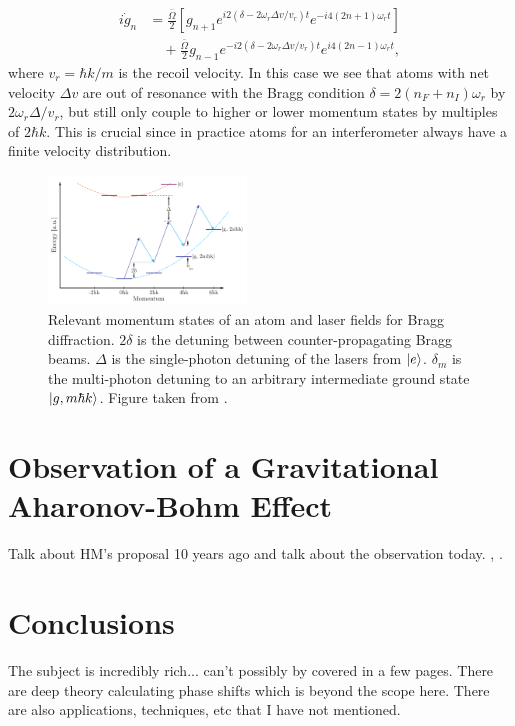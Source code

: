 \documentclass[reprint,
nofootinbib,
amsmath,amssymb,
aps]{revtex4-1}
\newcommand{\f}[2]{\frac{#1}{#2}}
\newcommand{\lb}{\left[}
\newcommand{\rb}{\right]}
\begin{document}
\begin{align*}
i\dot{g}_n &= \f{\bar{\Omega}}{2}\lb g_{n+1} e^{i2(\delta - 2\omega_r \Delta v/v_r)t} e^{-i4(2n+1)\omega_r t} \rb \\ 
& \quad + \f{\bar{\Omega}}{2}g_{n-1} e^{-i2(\delta - 2\omega_r \Delta v/v_r) t} e^{i4(2n-1)\omega_r t} ,
\end{align*}
where $v_r = \hbar k/m$ is the recoil velocity. In this case we see that atoms with net velocity $\Delta v$ are out of resonance with the Bragg condition $\delta = 2(n_F + n_I)\omega_r$ by $2\omega_r \Delta / v_r$, but still only couple to higher or lower momentum states by multiples of $2\hbar k$. This is crucial since in practice atoms for an interferometer always have a finite velocity distribution. 

\begin{figure}
	\includegraphics[width=0.47\textwidth]{Bragg.png}
	\caption{Relevant momentum states of an atom and laser fields for Bragg diffraction. $2\delta$ is the detuning between counter-propagating Bragg beams. $\Delta$ is the single-photon detuning of the lasers from $\ket{e}$. $\delta_m$ is the multi-photon detuning to an arbitrary intermediate ground state $\ket{g,m\hbar k}$.  Figure taken from \cite{estey2016precision}.}
	\label{fig:Bragg}
\end{figure}



\section{Observation of a Gravitational Aharonov-Bohm Effect}


Talk about HM's proposal 10 years ago and talk about the observation today. \cite{hohensee2012force}, \cite{overstreet2022observation}. 


\section{Conclusions}



The subject is incredibly rich... can't possibly by covered in a few pages. There are deep theory calculating phase shifts which is beyond the scope here. There are also applications, techniques, etc that I have not mentioned.
\end{document}
